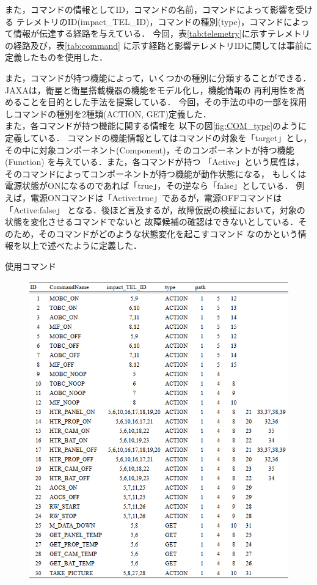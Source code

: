 \documentclass[11pt]{jsreport}
\begin{document}
また，コマンドの情報としてID，コマンドの名前，コマンドによって影響を受ける
テレメトリのID(impact\_TEL\_ID)，コマンドの種別(type)，コマンドによって情報が伝達する経路を与えている．
今回，表\ref{tab:telemetry}に示すテレメトリの経路及び，表\ref{tab:command}
に示す経路と影響テレメトリIDに関しては事前に定義したものを使用した．

また，コマンドが持つ機能によって，いくつかの種別に分類することができる．
JAXA\cite{JAXA2020}は，衛星と衛星搭載機器の機能をモデル化し，機能情報の
再利用性を高めることを目的とした手法を提案している．
今回，その手法の中の一部を採用しコマンドの種別を2種類(ACTION, GET)定義した．\\
また，各コマンドが持つ機能に関する情報を
以下の図\ref{fig:COM_type}のように定義している．
コマンドの機能情報としてはコマンドの対象を「target」とし，
その中に対象コンポーネント(Component)，そのコンポーネントが持つ機能(Function)
を与えている．また，各コマンドが持つ 「Active」という属性は，
そのコマンドによってコンポーネントが持つ機能が動作状態になる，
もしくは電源状態がONになるのであれば「true」，その逆なら「false」としている．
例えば，電源ONコマンドは「Active:true」であるが，電源OFFコマンドは「Active:false」
となる．後ほど言及するが，故障仮説の検証において，対象の状態を変化させるコマンドでないと
故障候補の確認はできないとしている．そのため，そのコマンドがどのような状態変化を起こすコマンド
なのかという情報を以上で述べたように定義した．

\begin{table}[H]
   \centering
   \caption{使用コマンド}
   \label{tab:command}
\end{table}
\vspace{-2zh}
\begin{figure}[H]
   \centering
      \includegraphics[width=12cm]{figure/COM.png}
\end{figure}
\end{document}
